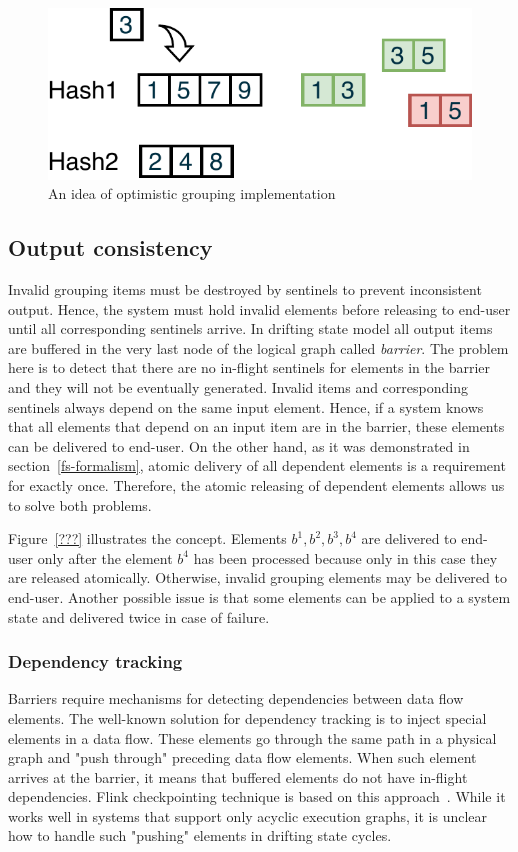 \begin{figure}[htbp]
  \centering
  \includegraphics[width=.35\textwidth]{pics/grouping-invalidation}
  \caption{An idea of optimistic grouping implementation}
  \label {optimistic-grouping}
\end{figure} 

\subsection{Output consistency}

Invalid grouping items must be destroyed by sentinels to prevent inconsistent output. Hence, the system must hold invalid elements before releasing to end-user until all corresponding sentinels arrive. In drifting state model all output items are buffered in the very last node of the logical graph called {\em barrier}. The problem here is to detect that there are no in-flight sentinels for elements in the barrier and they will not be eventually generated. Invalid items and corresponding sentinels always depend on the same input element. Hence, if a system knows that all elements that depend on an input item are in the barrier, these elements can be delivered to end-user. On the other hand, as it was demonstrated in section~\ref{fs-formalism}, atomic delivery of all dependent elements is a requirement for exactly once. Therefore, the atomic releasing of dependent elements allows us to solve both problems. 

Figure~\ref{???} illustrates the concept. Elements $b^{1},b^{2},b^{3},b^{4}$ are delivered to end-user only after the element $b^{4}$ has been processed because only in this case they are released atomically. Otherwise, invalid grouping elements may be delivered to end-user. Another possible issue is that some elements can be applied to a system state and delivered twice in case of failure. 

\subsubsection{Dependency tracking}

Barriers require mechanisms for detecting dependencies between data flow elements. The well-known solution for dependency tracking is to inject special elements in a data flow. These elements go through the same path in a physical graph and "push through" preceding data flow elements. When such element arrives at the barrier, it means that buffered elements do not have in-flight dependencies. Flink checkpointing technique is based on this approach~\cite{Carbone:2017:SMA:3137765.3137777}. While it works well in systems that support only acyclic execution graphs, it is unclear how to handle such "pushing" elements in drifting state cycles. 


